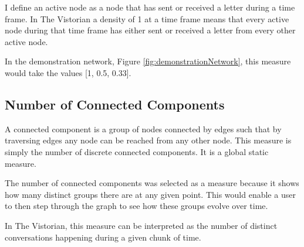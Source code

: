 I define an active node as a node that has sent or received a letter during a time frame. In The Vistorian a density of 1 at a time frame means that every active node during that time frame has either sent or received a letter from every other active node.

In the demonstration network, Figure \ref{fig:demonstrationNetwork}, this measure would take the values [1, 0.5, 0.33]. 



\subsection{Number of Connected Components}

A connected component is a group of nodes connected by edges such that by traversing edges any node can be reached from any other node. This measure is simply the number of discrete connected components. It is a global static measure.

The number of connected components was selected as a measure because it shows how many distinct groups there are at any given point. This would enable a user to then step through the graph to see how these groups evolve over time.

In The Vistorian, this measure can be interpreted as the number of distinct conversations happening during a given chunk of time. 


